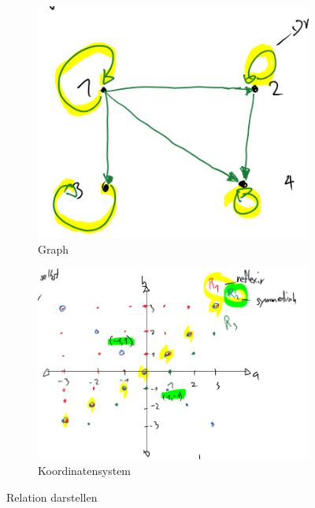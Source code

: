 \begin{figure}[h!]
	\centering
	\begin{subfigure}[b]{0.27\textwidth}
		\includegraphics[width=\textwidth]{fig/knoten_kanten.png}
		\caption{Graph}
		\label{fig:relation-knoten-kanten}
	\end{subfigure}
	\begin{subfigure}[b]{0.3\textwidth}
		\includegraphics[width=\textwidth]{fig/koordinatensystem.png}
		\caption{Koordinatensystem}
		\label{fig:relation-koordinatensystem}
	\end{subfigure}
	\caption{Relation darstellen}
	\label{fig:relation-darstellen}
\end{figure} 

